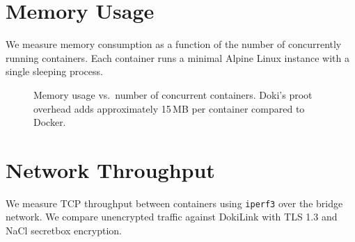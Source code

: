 \section{Memory Usage}
\label{sec:memory-usage}

We measure memory consumption as a function of the number of
concurrently running containers. Each container runs a minimal
Alpine Linux instance with a single sleeping process.

\begin{figure}[htbp]
  \centering
  \caption{Memory usage vs.\ number of concurrent containers. Doki's
    proot overhead adds approximately 15\,MB per container compared
    to Docker.}
  \label{fig:memory-usage}
\end{figure}

\section{Network Throughput}
\label{sec:network-throughput}

We measure TCP throughput between containers using \texttt{iperf3}
over the bridge network. We compare unencrypted traffic against
DokiLink with TLS 1.3 and NaCl secretbox encryption.

